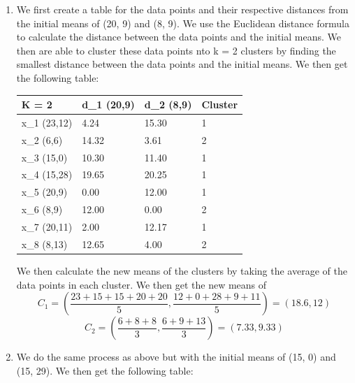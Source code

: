 \documentclass{article}
\begin{document}
\begin{enumerate}
    \item We first create a table for the data points and their respective distances from the initial means of (20, 9) and (8, 9). We use the Euclidean distance formula to calculate the distance between the data points and the initial means. We then are able to cluster these data points nto k = 2 clusters by finding the smallest distance between the data points and the initial means. We then get the following table:
    
    \begin{table}[h]
        \begin{tabular}{|l|l|l|l|}
        \hline
        K = 2        & d\_1 (20,9) & d\_2 (8,9) & Cluster \\ \hline
        x\_1 (23,12) & 4.24        & 15.30      & 1       \\ \hline
        x\_2 (6,6)   & 14.32       & 3.61       & 2       \\ \hline
        x\_3 (15,0)  & 10.30       & 11.40      & 1       \\ \hline
        x\_4 (15,28) & 19.65       & 20.25      & 1       \\ \hline
        x\_5 (20,9)  & 0.00        & 12.00      & 1       \\ \hline
        x\_6 (8,9)   & 12.00       & 0.00       & 2       \\ \hline
        x\_7 (20,11) & 2.00        & 12.17      & 1       \\ \hline
        x\_8 (8,13)  & 12.65       & 4.00       & 2       \\ \hline
        \end{tabular}
        \centering
    \end{table}

    We then calculate the new means of the clusters by taking the average of the data points in each cluster. We then get the new means of 
    \[C_1 = (\frac{23 + 15 + 15 + 20 + 20}{5}, \frac{12 + 0 + 28 + 9 + 11}{5}) = (18.6,12)\]
    \[C_2 = (\frac{6 + 8 + 8}{3}, \frac{6 + 9 + 13}{3}) = (7.33,9.33)\]

    \item We do the same process as above but with the initial means of (15, 0) and (15, 29). We then get the following table:
    

\end{enumerate}
\end{document}
